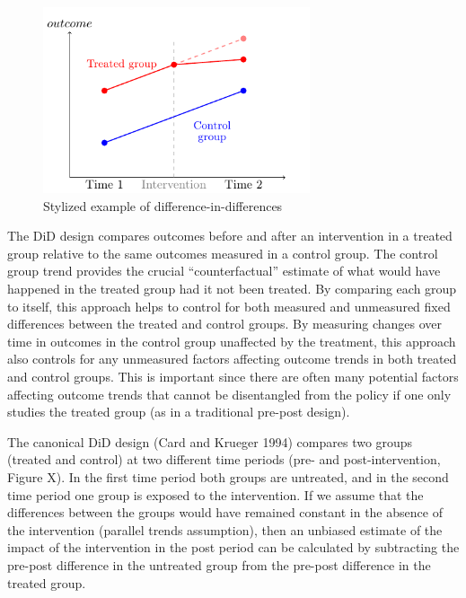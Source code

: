 \documentclass[
  letterpaper,
  DIV=11,
  numbers=noendperiod]{scrartcl}
\begin{document}
\begin{figure}

{\centering \includegraphics[width=0.7\textwidth,height=\textheight]{hei-report_files/figure-pdf/didfig-1.pdf}

}

\caption{Stylized example of difference-in-differences}

\end{figure}%

The DiD design compares outcomes before and after an intervention in a
treated group relative to the same outcomes measured in a control group.
The control group trend provides the crucial ``counterfactual'' estimate
of what would have happened in the treated group had it not been
treated. By comparing each group to itself, this approach helps to
control for both measured and unmeasured fixed differences between the
treated and control groups. By measuring changes over time in outcomes
in the control group unaffected by the treatment, this approach also
controls for any unmeasured factors affecting outcome trends in both
treated and control groups. This is important since there are often many
potential factors affecting outcome trends that cannot be disentangled
from the policy if one only studies the treated group (as in a
traditional pre-post design).

The canonical DiD design (Card and Krueger 1994) compares two groups
(treated and control) at two different time periods (pre- and
post-intervention, Figure X). In the first time period both groups are
untreated, and in the second time period one group is exposed to the
intervention. If we assume that the differences between the groups would
have remained constant in the absence of the intervention (parallel
trends assumption), then an unbiased estimate of the impact of the
intervention in the post period can be calculated by subtracting the
pre-post difference in the untreated group from the pre-post difference
in the treated group.
\end{document}
